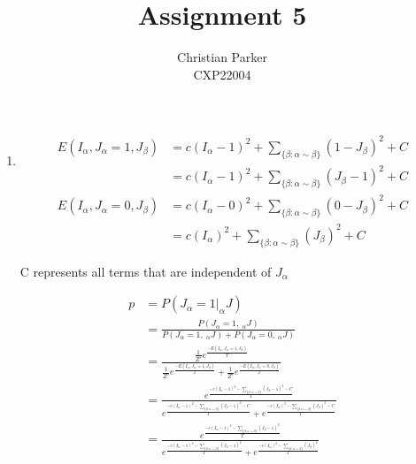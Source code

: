\documentclass{article}
\title{Assignment 5}
\author{Christian Parker \\ CXP22004}
\begin{document}
\maketitle

\begin{enumerate}
    \item
    \begin{align*}
        E(I_{\alpha}, J_{\alpha} = 1, J_{\beta})
            &= c (I_{\alpha} - 1)^2 + \sum_{\{\beta : \alpha \sim \beta\}}{(1 - J_{\beta})^2} + C \\
            &= c (I_{\alpha} - 1)^2 + \sum_{\{\beta : \alpha \sim \beta\}}{(J_{\beta} - 1)^2} + C
    \end{align*}
    \begin{align*}
        E(I_{\alpha}, J_{\alpha} = 0, J_{\beta})
            &= c (I_{\alpha} - 0)^2 + \sum_{\{\beta : \alpha \sim \beta\}}{(0 - J_{\beta})^2} + C \\
            &= c (I_{\alpha})^2 + \sum_{\{\beta : \alpha \sim \beta\}}{(J_{\beta})^2} + C
    \end{align*}
    \begin{center}
        C represents all terms that are independent of \(J_\alpha\)
    \end{center}
    \begin{align*}
        p
            &= P(J_{\alpha} = 1 |_\alpha J) \\
            &= \frac{P(J_{\alpha} = 1,\ _\alpha J)}{P(J_{\alpha} = 1,\ _\alpha J) + P(J_{\alpha} = 0,\ _\alpha J)} \\
            &= \frac{\frac{1}{Z'} e^{\frac{-E(I_{\alpha}, J_{\alpha} = 1, J_{\beta})}{T}}}{\frac{1}{Z'} e^{\frac{-E(I_{\alpha}, J_{\alpha} = 1, J_{\beta})}{T}} + \frac{1}{Z'} e^{\frac{-E(I_{\alpha}, J_{\alpha} = 0, J_{\beta})}{T}}} \\
            &= \frac{e^{\frac{-c (I_{\alpha} - 1)^2 - \sum_{\{\beta : \alpha \sim \beta\}}{(J_{\beta} - 1)^2} - C}{T}}}{e^{\frac{-c (I_{\alpha} - 1)^2 - \sum_{\{\beta : \alpha \sim \beta\}}{(J_{\beta} - 1)^2} - C}{T}} + e^{\frac{-c (I_{\alpha})^2 - \sum_{\{\beta : \alpha \sim \beta\}}{(J_{\beta})^2} - C}{T}}} \\
            &= \frac{e^{\frac{-c (I_{\alpha} - 1)^2 - \sum_{\{\beta : \alpha \sim \beta\}}{(J_{\beta} - 1)^2}}{T}}}{e^{\frac{-c (I_{\alpha} - 1)^2 - \sum_{\{\beta : \alpha \sim \beta\}}{(J_{\beta} - 1)^2}}{T}} + e^{\frac{-c (I_{\alpha})^2 - \sum_{\{\beta : \alpha \sim \beta\}}{(J_{\beta})^2}}{T}}}
    \end{align*}


\end{enumerate}
\end{document}
